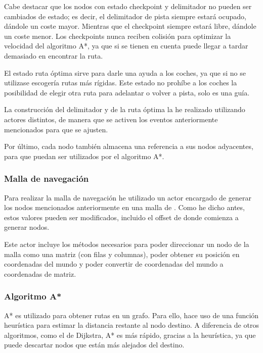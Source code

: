 \bigskip

Cabe destacar que los nodos con estado checkpoint y delimitador no pueden ser cambiados de estado; es decir, el delimitador de pista siempre estará ocupado, dándole un coste mayor. Mientras que el checkpoint siempre estará libre, dándole un coste menor. Los checkpoints nunca reciben colisión para optimizar la velocidad del algoritmo A*, ya que si se tienen en cuenta puede llegar a tardar demasiado en encontrar la ruta.

\bigskip

El estado ruta óptima sirve para darle una ayuda a los coches, ya que si no se utilizase escogería rutas más rígidas. Este estado no prohíbe a los coches la posibilidad de elegir otra ruta para adelantar o volver a pista, solo es una guía.

\bigskip

La construcción del delimitador y de la ruta óptima la he realizado utilizando actores distintos, de manera que se activen los eventos anteriormente mencionados para que se ajusten.

\bigskip

Por último, cada nodo también almacena una referencia a sus nodos adyacentes, para que puedan ser utilizados por el algoritmo A*.

\subsubsection{Malla de navegación}

Para realizar la malla de navegación he utilizado un actor encargado de generar los nodos mencionados anteriormente en una malla de \gridSize. Como he dicho antes, estos valores pueden ser modificados, incluido el offset de donde comienza a generar nodos.

\bigskip

Este actor incluye los métodos necesarios para poder direccionar un nodo de la malla como una matriz (con filas y columnas), poder obtener su posición en coordenadas del mundo y poder convertir de coordenadas del mundo a coordenadas de matriz.

\subsubsection{Algoritmo A*}

A* es utilizado para obtener rutas en un grafo. Para ello, hace uso de una función heurística para estimar la distancia restante al nodo destino. A diferencia de otros algoritmos, como el de Dijkstra, A* es más rápido, gracias a la heurística, ya que puede descartar nodos que están más alejados del destino.

